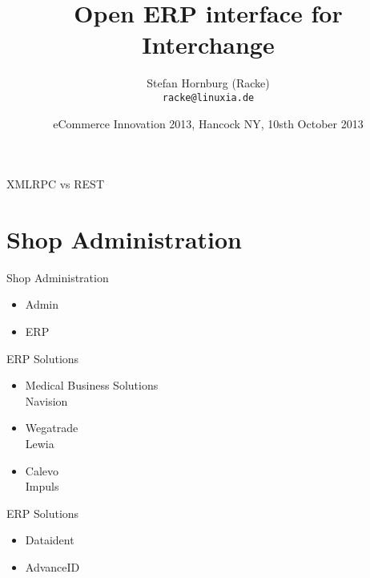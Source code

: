 \usepackage[utf8]{inputenc}
\usepackage[T1]{fontenc}
\usepackage{mathptmx}
\usepackage[scaled=.90]{helvet}
\usepackage{courier}
\usepackage{caption}
\captionsetup{labelformat=empty,labelsep=none}
\usepackage{beamerthemesplit}
\usepackage{verbatim}
\usepackage{hyperref}
\usepackage{listings}
\lstset{language=Perl,basicstyle=\normalsize,tabsize=3,showstringspaces=false}

\title{Open ERP interface for Interchange}
\author[racke]{Stefan Hornburg (Racke)\\ \texttt{racke@linuxia.de}}
\date{eCommerce Innovation 2013, Hancock NY, 10sth October 2013}


\maketitle{}

\begin{frame}
  \titlepage
\end{frame}

\tableofcontents

XMLRPC vs REST

\section{Shop Administration}

\begin{frame}{Shop Administration}
\begin{itemize}
\item Admin
\item ERP
\end{itemize}
\end{frame}

\begin{frame}{ERP Solutions}
\begin{itemize}
\item Medical Business Solutions \\
      Navision
\item Wegatrade \\
      Lewia
\item Calevo \\
      Impuls
\end{itemize}
\end{frame}

\begin{frame}{ERP Solutions}
\begin{itemize}
\item Dataident
\item AdvanceID
\end{itemize}
\end{frame}

